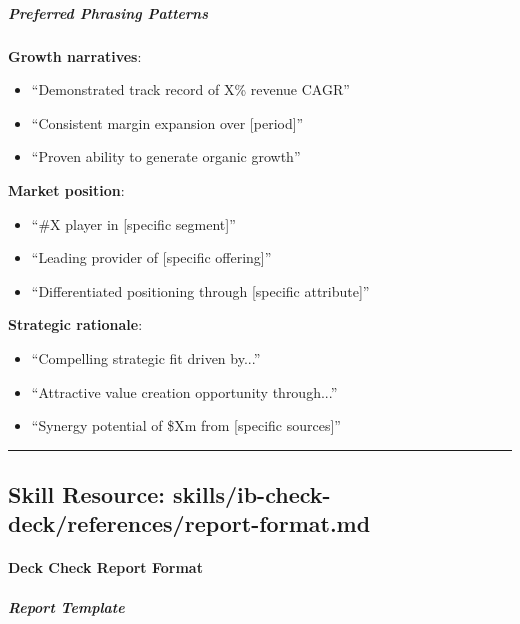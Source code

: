 \documentclass[11pt]{article}
\begin{document}
\subparagraph{Preferred Phrasing Patterns}\mbox{}\par

\textbf{Growth narratives}:

\begin{itemize}[leftmargin=*,itemsep=2pt,topsep=2pt]
\item {} ``Demonstrated track record of X\% revenue CAGR''
\item {} ``Consistent margin expansion over [period]''
\item {} ``Proven ability to generate organic growth''
\end{itemize}

\textbf{Market position}:

\begin{itemize}[leftmargin=*,itemsep=2pt,topsep=2pt]
\item {} ``\#X player in [specific segment]''
\item {} ``Leading provider of [specific offering]''
\item {} ``Differentiated positioning through [specific attribute]''
\end{itemize}

\textbf{Strategic rationale}:

\begin{itemize}[leftmargin=*,itemsep=2pt,topsep=2pt]
\item {} ``Compelling strategic fit driven by...''
\item {} ``Attractive value creation opportunity through...''
\item {} ``Synergy potential of \$Xm from [specific sources]''
\end{itemize}

\vspace{0.8em}\hrule\vspace{0.8em}

\subsection{Skill Resource: skills/ib-check-deck/references/report-format.md}\label{file:skills-ib-check-deck-references-report-format-md}

\paragraph{Deck Check Report Format}\mbox{}\par

\subparagraph{Report Template}\mbox{}\par
\end{document}
